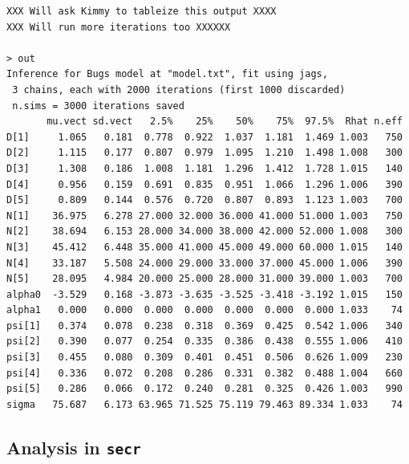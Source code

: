 {\small
\begin{verbatim}
XXX Will ask Kimmy to tableize this output XXXX
XXX Will run more iterations too XXXXXX

> out
Inference for Bugs model at "model.txt", fit using jags,
 3 chains, each with 2000 iterations (first 1000 discarded)
 n.sims = 3000 iterations saved
       mu.vect sd.vect   2.5%    25%    50%    75%  97.5%  Rhat n.eff
D[1]     1.065   0.181  0.778  0.922  1.037  1.181  1.469 1.003   750
D[2]     1.115   0.177  0.807  0.979  1.095  1.210  1.498 1.008   300
D[3]     1.308   0.186  1.008  1.181  1.296  1.412  1.728 1.015   140
D[4]     0.956   0.159  0.691  0.835  0.951  1.066  1.296 1.006   390
D[5]     0.809   0.144  0.576  0.720  0.807  0.893  1.123 1.003   700
N[1]    36.975   6.278 27.000 32.000 36.000 41.000 51.000 1.003   750
N[2]    38.694   6.153 28.000 34.000 38.000 42.000 52.000 1.008   300
N[3]    45.412   6.448 35.000 41.000 45.000 49.000 60.000 1.015   140
N[4]    33.187   5.508 24.000 29.000 33.000 37.000 45.000 1.006   390
N[5]    28.095   4.984 20.000 25.000 28.000 31.000 39.000 1.003   700
alpha0  -3.529   0.168 -3.873 -3.635 -3.525 -3.418 -3.192 1.015   150
alpha1   0.000   0.000  0.000  0.000  0.000  0.000  0.000 1.033    74
psi[1]   0.374   0.078  0.238  0.318  0.369  0.425  0.542 1.006   340
psi[2]   0.390   0.077  0.254  0.335  0.386  0.438  0.555 1.006   410
psi[3]   0.455   0.080  0.309  0.401  0.451  0.506  0.626 1.009   230
psi[4]   0.336   0.072  0.208  0.286  0.331  0.382  0.488 1.004   660
psi[5]   0.286   0.066  0.172  0.240  0.281  0.325  0.426 1.003   990
sigma   75.687   6.173 63.965 71.525 75.119 79.463 89.334 1.033    74
\end{verbatim}
}


\subsection{Analysis in \mbox{\tt secr} }


